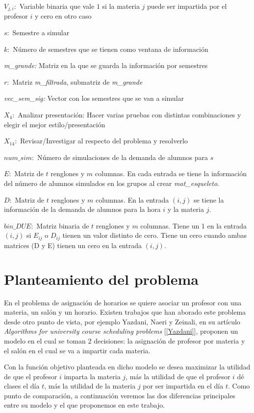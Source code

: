 $V_{j,i}:$ Variable binaria que vale $1$ si la materia $j$ puede ser impartida por  el profesor $i$ y cero en otro caso

$s:$ Semestre a simular

$k:$ Número de semestres que se tienen como ventana de información

\textit{m\_grande:} Matriz en la que se guarda la información por semestres

$r:$ Matriz \textit{m\_filtrada}, submatriz de \textit{m\_grande}

\textit{vec\_sem\_sig:} Vector con los semestres que se van a simular

$X_{4}:$ Analizar presentación: Hacer varias pruebas con distintas combinaciones y elegir el mejor estilo/presentación

$X_{14}:$ Revisar/Investigar al respecto del problema y resolverlo

$num\_sim:$ Número de simulaciones de la demanda de alumnos para $s$

$E:$ Matriz de $t$ renglones y $m$ columnas. En cada entrada se tiene la información del número de alumnos simulados en los grupos al crear \textit{mat\_esqueleto}.

$D:$ Matriz de $t$ renglones y $m$ columnas. En la entrada $(i,j)$ se tiene la información de la demanda de alumnos para la hora $i$ y la materia $j$.

$bin\_DUE:$ Matriz binaria de $t$ renglones y $m$ columnas. Tiene un 1 en la entrada $(i,j)$ si $E_{ij}$ o $D_{ij}$ tienen un valor distinto de cero. Tiene un cero cuando ambas matrices (D y E) tienen un cero en la entrada $(i,j)$.

  
  
\section{Planteamiento del problema}

En el problema de asignación de horarios se quiere asociar un profesor con una materia, un salón y un horario. Existen trabajos que han aborado este problema desde otro punto de vista, por ejemplo Yazdani, Naeri y Zeinali, en su artículo \textit{Algorithms for university course scheduling problems} [\ref{Yazdani}], proponen un modelo en el cual se toman 2 decisiones: la asignación de profesor por materia y el salón en el cual se va a impartir cada materia.

Con la función objetivo planteada en dicho modelo se desea maximizar la utilidad de que el profesor $i$ imparta la materia $j$, más la utilidad de que el profesor $i$ dé clases el día $t$, más la utilidad de la materia $j$ por ser impartida en el día $t$. Como punto de comparación, a continuación veremos las dos diferencias principales entre su modelo y el que proponemos en este trabajo.

